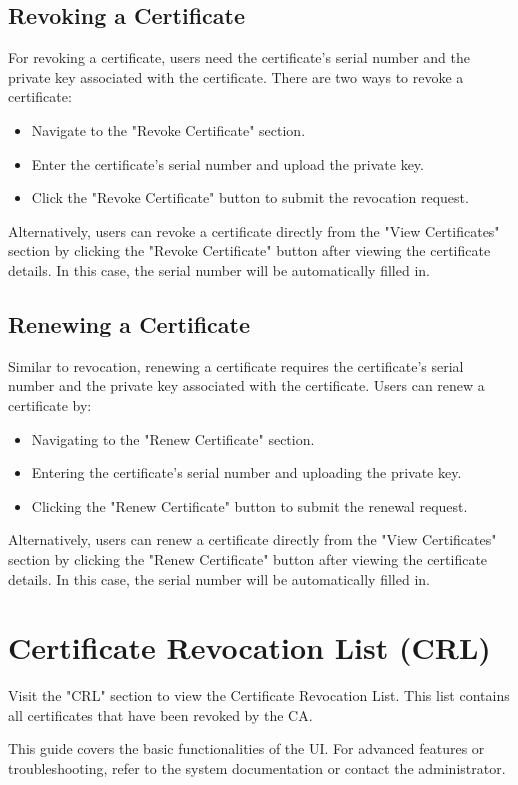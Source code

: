 \subsection{Revoking a Certificate}
For revoking a certificate, users need the certificate's serial number and the private key associated with the certificate.
There are two ways to revoke a certificate:
\begin{itemize}
    \item Navigate to the "Revoke Certificate" section.
    \item Enter the certificate's serial number and upload the private key.
    \item Click the "Revoke Certificate" button to submit the revocation request.
\end{itemize}
Alternatively, users can revoke a certificate directly from the "View Certificates" section by clicking the "Revoke Certificate" button after viewing the certificate details.
In this case, the serial number will be automatically filled in.

\subsection{Renewing a Certificate}
Similar to revocation, renewing a certificate requires the certificate's serial number and the private key associated with the certificate.
Users can renew a certificate by:
\begin{itemize}
    \item Navigating to the "Renew Certificate" section.
    \item Entering the certificate's serial number and uploading the private key.
    \item Clicking the "Renew Certificate" button to submit the renewal request.
\end{itemize}
Alternatively, users can renew a certificate directly from the "View Certificates" section by clicking the "Renew Certificate" button after viewing the certificate details.
In this case, the serial number will be automatically filled in.

\section{Certificate Revocation List (CRL)}
Visit the "CRL" section to view the Certificate Revocation List. 
This list contains all certificates that have been revoked by the CA. 

This guide covers the basic functionalities of the UI. For advanced features or troubleshooting, refer to the system documentation or contact the administrator.